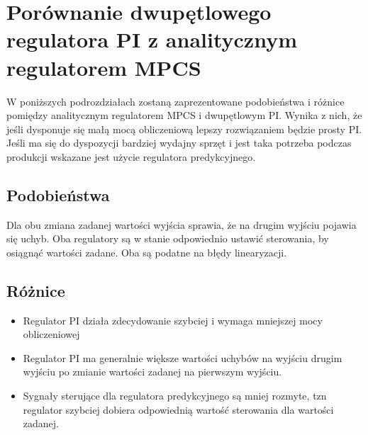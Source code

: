 \section{Porównanie dwupętlowego regulatora PI z analitycznym regulatorem MPCS}
\indent W poniższych podrozdziałach zostaną zaprezentowane podobieństwa i różnice pomiędzy analitycznym regulatorem MPCS i dwupętlowym PI. Wynika z nich, że jeśli dysponuje się małą mocą obliczeniową lepszy rozwiązaniem będzie prosty PI. Jeśli ma się do dyspozycji bardziej wydajny sprzęt i jest taka potrzeba podczas produkcji wskazane jest użycie regulatora predykcyjnego.
\subsection{Podobieństwa}
\indent Dla obu zmiana zadanej wartości wyjścia sprawia, że na drugim wyjściu pojawia się uchyb.
\indent Oba regulatory są w stanie odpowiednio ustawić sterowania, by osiągnąć wartości zadane.
\indent Oba są podatne na błędy linearyzacji.
\subsection{Różnice}
\begin{itemize}
    \item Regulator PI działa zdecydowanie szybciej i wymaga mniejszej mocy obliczeniowej
    \item Regulator PI ma generalnie większe wartości uchybów na wyjściu drugim wyjściu po zmianie wartości zadanej na pierwszym wyjściu.
    \item Sygnały sterujące dla regulatora predykcyjnego są mniej rozmyte, tzn regulator szybciej dobiera odpowiednią wartość sterowania dla wartości zadanej.
\end{itemize}
